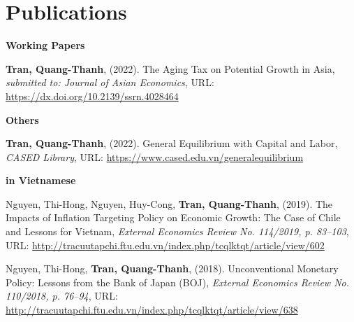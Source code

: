 
\section{\sc Publications}
{\bf Working Papers}
\vspace*{.05in}
\begin{etaremune}[]
\item
  {\bf Tran, Quang-Thanh},
  (2022).
  {The Aging Tax on Potential Growth in Asia},
  {\it submitted to: Journal of Asian Economics},
  {URL: \url{https://dx.doi.org/10.2139/ssrn.4028464}}
\end{etaremune}

{\bf Others}
\vspace*{.05in}
\vspace*{.05in}
\begin{etaremune}[]
\item
  {\bf Tran, Quang-Thanh},
  (2022).
  {General Equilibrium with Capital and Labor},
  {\it CASED Library},
  {URL: \url{https://www.cased.edu.vn/generalequilibrium}}
\end{etaremune}

{\bf in Vietnamese}
\vspace*{.05in}
\begin{etaremune}[]
	\item
	Nguyen, Thi-Hong,
	Nguyen, Huy-Cong,
	{\bf Tran, Quang-Thanh},
	(2019).
	{The Impacts of Inflation Targeting Policy on Economic Growth: The Case of Chile and Lessons for Vietnam},
	{\it External Economics Review No. 114/2019, p. 83--103},
	{URL: \url{http://tracuutapchi.ftu.edu.vn/index.php/tcqlktqt/article/view/602}}

	\item 
	Nguyen, Thi-Hong,
	{\bf Tran, Quang-Thanh},
	(2018).
	Unconventional Monetary Policy: Lessons from the Bank of Japan (BOJ),
	{\it External Economics Review No. 110/2018, p. 76--94},
	{URL: \url{http://tracuutapchi.ftu.edu.vn/index.php/tcqlktqt/article/view/638}}
\end{etaremune}


